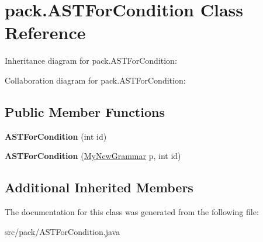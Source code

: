 \hypertarget{classpack_1_1_a_s_t_for_condition}{}\section{pack.\+A\+S\+T\+For\+Condition Class Reference}
\label{classpack_1_1_a_s_t_for_condition}


Inheritance diagram for pack.\+A\+S\+T\+For\+Condition\+:


Collaboration diagram for pack.\+A\+S\+T\+For\+Condition\+:
\subsection*{Public Member Functions}
\begin{DoxyCompactItemize}
\item 
{\bfseries A\+S\+T\+For\+Condition} (int id)\hypertarget{classpack_1_1_a_s_t_for_condition_af89a2121fa9027d91d81338a348b545b}{}\label{classpack_1_1_a_s_t_for_condition_af89a2121fa9027d91d81338a348b545b}

\item 
{\bfseries A\+S\+T\+For\+Condition} (\hyperlink{classpack_1_1_my_new_grammar}{My\+New\+Grammar} p, int id)\hypertarget{classpack_1_1_a_s_t_for_condition_a27ff4b9fadda693eee93f29eded6024a}{}\label{classpack_1_1_a_s_t_for_condition_a27ff4b9fadda693eee93f29eded6024a}

\end{DoxyCompactItemize}
\subsection*{Additional Inherited Members}


The documentation for this class was generated from the following file\+:\begin{DoxyCompactItemize}
\item 
src/pack/A\+S\+T\+For\+Condition.\+java\end{DoxyCompactItemize}

